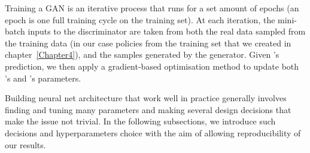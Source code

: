 Training a GAN is an iterative process that runs for a set amount of epochs (an epoch is one full training cycle on the training set).
At each iteration, the mini-batch inputs to the discriminator  are taken from both the real data sampled from the training data (in our case policies from the training set that we created in chapter~\ref{Chapter4}), and the samples generated by the generator.
Given 's prediction, we then apply a gradient-based optimisation method to update both 's and 's parameters.

Building neural net architecture that work well in practice generally involves finding and tuning many parameters and making several design decisions that make the issue not trivial. In the following subsections, we introduce such decisions and hyperparameters choice with the aim of allowing reproducibility of our results.

